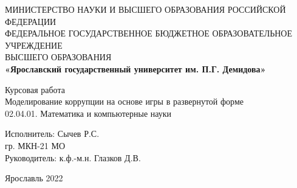 \begin{center}
	\large{МИНИСТЕРСТВО НАУКИ И ВЫСШЕГО ОБРАЗОВАНИЯ РОССИЙСКОЙ ФЕДЕРАЦИИ}\\
	\footnotesize{ФЕДЕРАЛЬНОЕ ГОСУДАРСТВЕННОЕ БЮДЖЕТНОЕ ОБРАЗОВАТЕЛЬНОЕ УЧРЕЖДЕНИЕ}\\ 
	\footnotesize{ВЫСШЕГО ОБРАЗОВАНИЯ}\\
	\small{\textbf{«Ярославский государственный университет им. П.Г. Демидова»}}\\
	\hfill \break
	\hfill\break
	\hfill \break
	\hfill \break
	\hfill \break
	\hfill \break
	\hfill \break
	\hfill \break
	\hfill \break
	\hfill \break
	
	\normalsize{Курсовая работа}\\
	\large{Моделирование коррупции на основе игры в развернутой форме}\\	
	02.04.01. Математика и компьютерные науки\\
	
	\hfill \break
	\hfill \break
	\hfill \break
	\hfill \break
	\hfill \break
\end{center}

\normalsize{ 
	\begin{flushleft}
		\hspace*{80mm}Исполнитель: Сычев Р.С. \\
		\hspace*{80mm}гр. МКН-21 МО \\
		\hspace*{80mm}Руководитель: к.ф.-м.н. Глазков Д.В.
	\end{flushleft}
}
\hfill \break
\hfill \break
\hfill \break
\hfill \break
\hfill \break
\hfill \break
\begin{center} Ярославль 2022 \end{center}
\thispagestyle{empty} %
